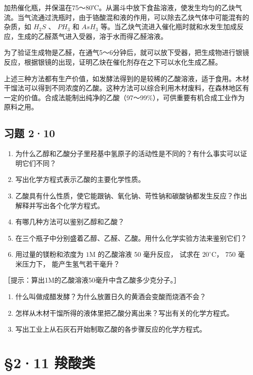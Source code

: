加热催化瓶，并保温在75～80℃。从漏斗中放下食盐溶液，使发生均匀的乙炔气流。当气流通过洗瓶时，由于铬酸混和液的作用，可以除去乙炔气体中可能混有的杂质，如
\(H_{2}S\) 、 \(PH_{3}\) 和 \(AsH_{3}\)
等。当乙炔气流进入催化瓶时就和水发生加成反应，生成的乙醛蒸气进入受器，溶于水而得乙醛溶液。

为了验证生成物是乙醛，在通气5～6分钟后，就可以放下受器，把生成物进行银镜反应，根据银镜的出现，证明乙炔在催化剂存在之下可以水化生成乙醛。

上述三种方法都有生产价值，如发酵法得到的是较稀的乙酸溶液，适于食用。木材干馏法可以得到不同浓度的乙酸。这种方法可以综合利用木材废料，在森林地区有一定的价值。合成法能制出纯净的乙酸（97～99\%），可供重要有机合成工业作为原料之用。

\subsection{习题 2·10}

\begin{enumerate}
\item
  为什么乙醇和乙酸分子里羟基中氢原子的活动性是不同的？有什么事实可以证明它们不同？
\item
  写出化学方程式表示乙酸的主要化学性质。
\item
  乙酸具有什么性质，使它能跟钠、氧化钠、苛性钠和碳酸钠都发生反应？作出解释并写出各个化学方程式。
\item
  有哪几种方法可以鉴别乙醇和乙酸？
\item
  在三个瓶子中分别盛着乙醇、乙醛、乙酸。用什么化学实验方法来鉴别它们？
\item
  用过量的镁粉和浓度为 \(1 \mathrm{M}\) 的乙酸溶液 50 毫升反应， 试求在
  \(20^{\circ} \mathrm{C}\)， 750 毫米压力下， 能产生氢气若干毫升？
\end{enumerate}

［提示：算出1M的乙酸溶液50毫升中含乙酸多少克分子。］

\begin{enumerate}[start=7]
\item
  什么叫做成醋发酵？为什么放置日久的黄酒会变酸而烧酒不会？
\item
  怎样从木材干馏所得的液体里把乙酸分离出来？写出有关的化学方程式。
\item
  写出工业上从石灰石开始制取乙酸的各步骤反应的化学方程式。
\end{enumerate}

\section{§2·11 羧酸类}

